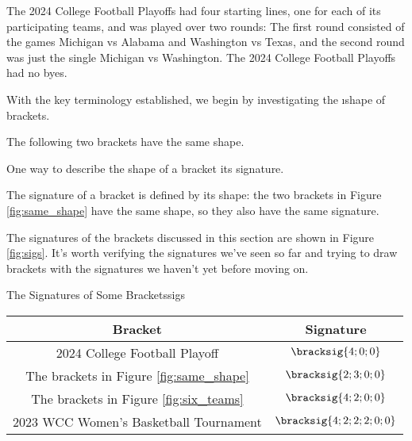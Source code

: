 {



The 2024 College Football Playoffs had four starting lines, one for each of its participating teams, and was played over two rounds: The first round consisted of the games Michigan vs Alabama and Washington vs Texas, and the second round was just the single  Michigan vs Washington. The 2024 College Football Playoffs had no byes.

With the key terminology established, we begin by investigating the \i{shape} of brackets.


The following two brackets have the same shape.


One way to describe the shape of a bracket its signature.


The signature of a bracket is defined by its shape: the two brackets in Figure \ref{fig:same_shape} have the same shape, so they also have the same signature.

The signatures of the brackets discussed in this section are shown in Figure \ref{fig:sigs}. It's worth verifying the signatures we've seen so far and trying to draw brackets with the signatures we haven't yet before moving on.

\begin{figg}{The Signatures of Some Brackets}{sigs}
    \begin{center}
        \begin{tabular}{ c | c }
            Bracket & Signature \\
            \hline
            2024 College Football Playoff & $\bracksig{4; 0; 0}$ \\
            The brackets in Figure \ref{fig:same_shape} & $\bracksig{2; 3; 0; 0}$\\
            The brackets in Figure \ref{fig:six_teams} & $\bracksig{4; 2; 0; 0}$\\
            2023 WCC Women's Basketball Tournament & $\bracksig{4;2;2;2;0;0}$ \\
        \end{tabular}
    \end{center}
\end{figg}

}
